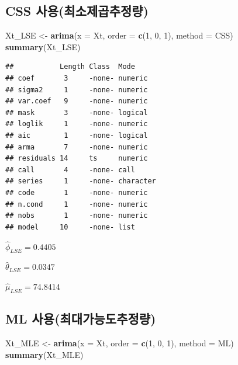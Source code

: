 \documentclass[
]{article}
\newenvironment{Shaded}{\begin{snugshade}}{\end{snugshade}}
\newcommand{\AttributeTok}[1]{\textcolor[rgb]{0.13,0.29,0.53}{#1}}
\newcommand{\DecValTok}[1]{\textcolor[rgb]{0.00,0.00,0.81}{#1}}
\newcommand{\FunctionTok}[1]{\textcolor[rgb]{0.13,0.29,0.53}{\textbf{#1}}}
\newcommand{\NormalTok}[1]{#1}
\newcommand{\OtherTok}[1]{\textcolor[rgb]{0.56,0.35,0.01}{#1}}
\newcommand{\StringTok}[1]{\textcolor[rgb]{0.31,0.60,0.02}{#1}}
\begin{document}
\subsection{CSS
사용(최소제곱추정량)}\label{css-uxc0acuxc6a9uxcd5cuxc18cuxc81cuxacf1uxcd94uxc815uxb7c9}

\begin{Shaded}
\begin{Highlighting}[]
\NormalTok{Xt\_LSE }\OtherTok{\textless{}{-}} \FunctionTok{arima}\NormalTok{(}\AttributeTok{x =}\NormalTok{ Xt, }\AttributeTok{order =} \FunctionTok{c}\NormalTok{(}\DecValTok{1}\NormalTok{, }\DecValTok{0}\NormalTok{, }\DecValTok{1}\NormalTok{), }\AttributeTok{method =} \StringTok{\textquotesingle{}CSS\textquotesingle{}}\NormalTok{)}
\FunctionTok{summary}\NormalTok{(Xt\_LSE)}
\end{Highlighting}
\end{Shaded}

\begin{verbatim}
##           Length Class  Mode     
## coef       3     -none- numeric  
## sigma2     1     -none- numeric  
## var.coef   9     -none- numeric  
## mask       3     -none- logical  
## loglik     1     -none- numeric  
## aic        1     -none- logical  
## arma       7     -none- numeric  
## residuals 14     ts     numeric  
## call       4     -none- call     
## series     1     -none- character
## code       1     -none- numeric  
## n.cond     1     -none- numeric  
## nobs       1     -none- numeric  
## model     10     -none- list
\end{verbatim}

\(\hat{\phi}_{LSE} = 0.4405\)

\(\hat{\theta}_{LSE} = 0.0347\)

\(\hat{\mu}_{LSE} = 74.8414\)

\subsection{ML
사용(최대가능도추정량)}\label{ml-uxc0acuxc6a9uxcd5cuxb300uxac00uxb2a5uxb3c4uxcd94uxc815uxb7c9}

\begin{Shaded}
\begin{Highlighting}[]
\NormalTok{Xt\_MLE }\OtherTok{\textless{}{-}} \FunctionTok{arima}\NormalTok{(}\AttributeTok{x =}\NormalTok{ Xt, }\AttributeTok{order =} \FunctionTok{c}\NormalTok{(}\DecValTok{1}\NormalTok{, }\DecValTok{0}\NormalTok{, }\DecValTok{1}\NormalTok{), }\AttributeTok{method =} \StringTok{\textquotesingle{}ML\textquotesingle{}}\NormalTok{)}
\FunctionTok{summary}\NormalTok{(Xt\_MLE)}
\end{Highlighting}
\end{Shaded}
\end{document}
